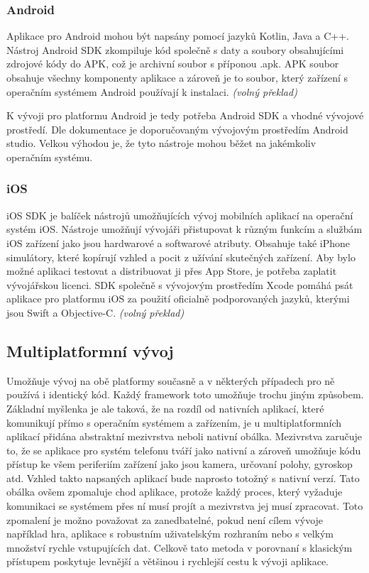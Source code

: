 \documentclass[
  biblatex,
  glossaries,
  index
]{kidiplom}
\begin{document}
\subsubsection{Android}
Aplikace pro Android mohou být napsány pomocí jazyků Kotlin, Java a C++. Nástroj Android SDK zkompiluje kód společně s daty a soubory obsahujícími zdrojové kódy do APK, což je archivní soubor s příponou .apk. APK soubor obsahuje všechny komponenty aplikace a zároveň je to soubor, který zařízení s operačním systémem Android používají k instalaci.
\cite{1}
\textit{(volný překlad)}

K vývoji pro platformu Android je tedy potřeba Android SDK a vhodné vývojové prostředí. Dle dokumentace je doporučovaným vývojovým prostředím Android studio. Velkou výhodou je, že tyto nástroje mohou běžet na jakémkoliv operačním systému.

\subsubsection{iOS}
iOS SDK je balíček nástrojů umožňujících vývoj mobilních aplikací na operační systém iOS. Nástroje umožňují vývojáři přistupovat k různým funkcím a službám iOS zařízení jako jsou hardwarové a softwarové atributy. Obsahuje také iPhone simulátory, které kopírují vzhled a pocit z užívání skutečných zařízení. Aby bylo možné aplikaci testovat a distribuovat ji přes App Store, je potřeba zaplatit vývojářskou licenci. SDK společně s vývojovým prostředím Xcode pomáhá psát aplikace pro platformu iOS za použití oficialně podporovaných  jazyků, kterými jsou Swift a Objective-C. 
\cite{2}
\textit{(volný překlad)}

\subsection{Multiplatformní vývoj}
Umožňuje vývoj na obě platformy současně a v některých případech pro ně používá i identický kód. Každý framework toto umožňuje trochu jiným způsobem. Základní myšlenka je ale taková, že na rozdíl od nativních aplikací, které komunikují přímo s operačním systémem a zařízením, je u multiplatformních aplikací přidána abstraktní mezivrstva neboli nativní obálka. Mezivrstva zaručuje to, že se aplikace pro systém telefonu tváří jako nativní a zároveň umožňuje kódu přístup ke všem periferiím zařízení jako jsou kamera, určovaní polohy, gyroskop atd. Vzhled takto napsaných aplikací bude naprosto totožný s nativní verzí. Tato obálka ovšem zpomaluje chod aplikace, protože každý proces, který vyžaduje komunikaci se systémem přes ní musí projít a mezivrstva jej musí zpracovat. Toto zpomalení je možno považovat za zanedbatelné, pokud není cílem vývoje například hra, aplikace s robustním uživatelským rozhraním nebo s velkým množství rychle vstupujících dat. Celkově tato metoda v porovnaní s klasickým přístupem poskytuje levnější a většinou i rychlejší cestu k vývoji aplikace. 
\end{document}
